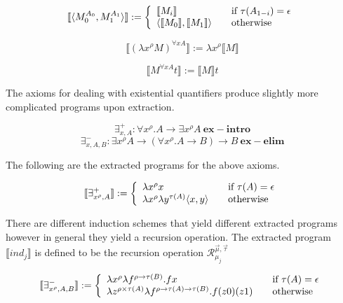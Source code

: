 \[
\llbracket \langle M^{A_0}_0, M^{A_1}_1 \rangle \rrbracket := \left\{ 
\begin{array}{l l}
\llbracket M_i \rrbracket  & \quad \text{if $\tau (A_{1-i}) = \epsilon$} \\ 
\langle \llbracket M_0 \rrbracket , \llbracket M_1 \rrbracket \rangle & \quad \text{otherwise} \\

\end{array} \right.
 \]


$$\llbracket ( \lambda x^{\rho} M)^{\forall x A} \rrbracket := \lambda x^{\rho} \llbracket   M \rrbracket$$

$$\llbracket M^{\forall x A} t \rrbracket := \llbracket M \rrbracket t$$


The axioms for dealing with existential quantifiers produce slightly more
complicated programs upon extraction. 

$$ \exists^+_{x,A} : \forall x^{\rho}.A \to \exists x^{\rho} A  \ \mathbf{ex-intro}$$
$$ \exists^-_{x,A,B} : \exists x^{\rho} A \to (\forall x^{\rho}. A \to B) \to
B  \ \mathbf{ex-elim}$$

The following are the extracted programs for the above axioms.

\[ \llbracket \exists^{+}_{x^{\rho}, A} \rrbracket := \left\{ 
\begin{array}{l l}
\lambda x^{\rho} x  & \quad \text{if $\tau (A) = \epsilon$} \\ 
\lambda x^{\rho} \lambda y^{\tau (A)} \langle x,y \rangle & \quad \text{otherwise} \\

\end{array} \right.
\]

There are different induction schemes  that yield different extracted programs however in general they yield a recursion operation. The extracted program $\llbracket ind_j \rrbracket$ is defined to be the recursion operation $\mathcal{R}^{\vec{\mu},\vec{\tau}}_{\mu_j}$



\[ \llbracket \exists^{-}_{x^{\rho}, A, B} \rrbracket := \left\{ 
\begin{array}{l l}
\lambda x^{\rho} \lambda f^{\rho \to \tau (B)}. f x  & \quad \text{if $\tau (A) = \epsilon$} \\ 
\lambda z^{\rho \times \tau (A)} \lambda f^{\rho \to \tau (A) \to \tau (B)}. f
(z0) (z1) & \quad \text{otherwise} \\

\end{array} \right.
\]

